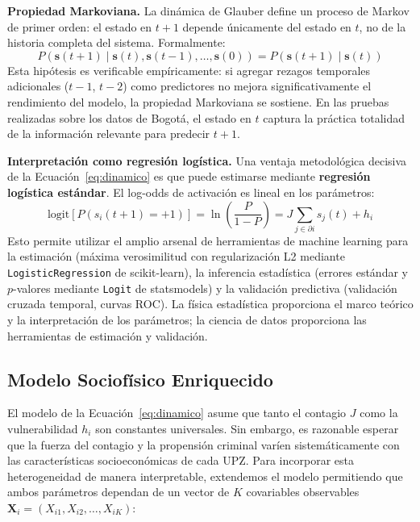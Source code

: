 \documentclass[12pt,a4paper]{article}
\begin{document}
\textbf{Propiedad Markoviana.} La dinámica de Glauber define un proceso de Markov de primer orden: el estado en $t+1$ depende únicamente del estado en $t$, no de la historia completa del sistema. Formalmente:
\begin{equation}
P\left(\mathbf{s}(t+1) \mid \mathbf{s}(t), \mathbf{s}(t-1), \ldots, \mathbf{s}(0)\right) = 
P\left(\mathbf{s}(t+1) \mid \mathbf{s}(t)\right)
\end{equation}
Esta hipótesis es verificable empíricamente: si agregar rezagos temporales adicionales ($t-1$, $t-2$) como predictores no mejora significativamente el rendimiento del modelo, la propiedad Markoviana se sostiene. En las pruebas realizadas sobre los datos de Bogotá, el estado en $t$ captura la práctica totalidad de la información relevante para predecir $t+1$.

\textbf{Interpretación como regresión logística.} Una ventaja metodológica decisiva de la Ecuación~\ref{eq:dinamico} es que puede estimarse mediante \textbf{regresión logística estándar}. El log-odds de activación es lineal en los parámetros:
\begin{equation}\label{eq:logit}
\text{logit}\left[P(s_i(t+1) = +1)\right] = \ln\left(\frac{P}{1-P}\right) = J \sum_{j \in \partial i} s_j(t) + h_i
\end{equation}
Esto permite utilizar el amplio arsenal de herramientas de machine learning para la estimación (máxima verosimilitud con regularización L2 mediante \texttt{LogisticRegression} de scikit-learn), la inferencia estadística (errores estándar y $p$-valores mediante \texttt{Logit} de statsmodels) y la validación predictiva (validación cruzada temporal, curvas ROC). La física estadística proporciona el marco teórico y la interpretación de los parámetros; la ciencia de datos proporciona las herramientas de estimación y validación.

\subsection{Modelo Sociofísico Enriquecido}

El modelo de la Ecuación~\ref{eq:dinamico} asume que tanto el contagio $J$ como la vulnerabilidad $h_i$ son constantes universales. Sin embargo, es razonable esperar que la fuerza del contagio y la propensión criminal varíen sistemáticamente con las características socioeconómicas de cada UPZ. Para incorporar esta heterogeneidad de manera interpretable, extendemos el modelo permitiendo que ambos parámetros dependan de un vector de $K$ covariables observables $\mathbf{X}_i = (X_{i1}, X_{i2}, \ldots, X_{iK})$:
\end{document}
